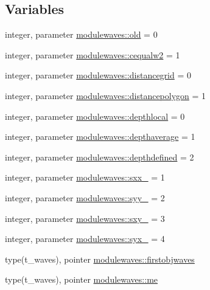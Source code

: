 \subsection*{Variables}
\begin{DoxyCompactItemize}
\item 
integer, parameter \mbox{\hyperlink{namespacemodulewaves_a37ca976268a75e2ffe857357fae6261e}{modulewaves\+::old}} = 0
\item 
integer, parameter \mbox{\hyperlink{namespacemodulewaves_afc5fc3687c43abb90ea8cc2924589fce}{modulewaves\+::cequalw2}} = 1
\item 
integer, parameter \mbox{\hyperlink{namespacemodulewaves_a8b9afda07a4ea806082f5af67fe11d9b}{modulewaves\+::distancegrid}} = 0
\item 
integer, parameter \mbox{\hyperlink{namespacemodulewaves_a87b7edc9eb41fa478761848a60f71b4c}{modulewaves\+::distancepolygon}} = 1
\item 
integer, parameter \mbox{\hyperlink{namespacemodulewaves_a27abfbda301e88b5203ea2a634fa7a94}{modulewaves\+::depthlocal}} = 0
\item 
integer, parameter \mbox{\hyperlink{namespacemodulewaves_aa5509403ebbe9faf3f9a266a1e8786e5}{modulewaves\+::depthaverage}} = 1
\item 
integer, parameter \mbox{\hyperlink{namespacemodulewaves_a06e058d903999d0b1ea133a633d3ba26}{modulewaves\+::depthdefined}} = 2
\item 
integer, parameter \mbox{\hyperlink{namespacemodulewaves_a4a5a7aa45ca3a0cba93680cb36c91160}{modulewaves\+::sxx\+\_\+}} = 1
\item 
integer, parameter \mbox{\hyperlink{namespacemodulewaves_a5389f28c1b6c4aaa509cbbc3861822ac}{modulewaves\+::syy\+\_\+}} = 2
\item 
integer, parameter \mbox{\hyperlink{namespacemodulewaves_aeb9c4e523fb97892db7106b076e0baec}{modulewaves\+::sxy\+\_\+}} = 3
\item 
integer, parameter \mbox{\hyperlink{namespacemodulewaves_a586347f5ce4be595211e01d98332e9fb}{modulewaves\+::syx\+\_\+}} = 4
\item 
type(t\+\_\+waves), pointer \mbox{\hyperlink{namespacemodulewaves_ac5eadc9545afc228b69aa1f9ddd61a8d}{modulewaves\+::firstobjwaves}}
\item 
type(t\+\_\+waves), pointer \mbox{\hyperlink{namespacemodulewaves_a14ae225a2982d0eb7560d9a9f889afb4}{modulewaves\+::me}}
\end{DoxyCompactItemize}
